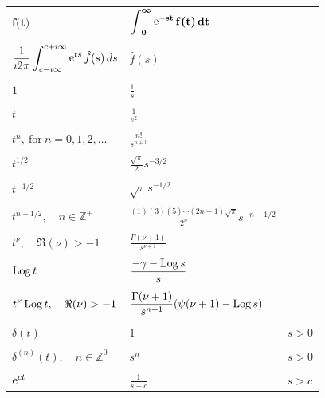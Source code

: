 \setlongtables
\begin{longtable}{lll}
  $\displaystyle \mathbf{f \boldsymbol{(} t \boldsymbol{)}}$
  & $\displaystyle \mathbf{\boldsymbol{\int}_0^{\boldsymbol{\infty}} \mathop{\mathrm{e}}\nolimits^{-s t}f \boldsymbol{(} t \boldsymbol{)} \,dt}$ 
  & \\
  \\
  $\displaystyle \frac{1}{\imath 2 \pi} 
  \int_{c - \imath \infty}^{c + \imath \infty} \mathop{\mathrm{e}}\nolimits^{t s} \hat{f}(s)\,d s$
  & $\displaystyle \hat{f}(s)$ 
  & \\
  \\
  $\displaystyle 1$
  & $\displaystyle \frac{1}{s}$
  & \\
  \\
  $\displaystyle t$
  & $\displaystyle \frac{1}{s^2}$
  & \\
  \\
  $\displaystyle t^n,\ \mathrm{for}\ n = 0,1,2,\ldots$
  & $\displaystyle \frac{n!}{s^{n+1}}$
  & \\
  \\
  $\displaystyle t^{1/2}$
  & $\displaystyle \frac{\sqrt{\pi}}{2} s^{-3/2}$
  & \\
  \\
  $\displaystyle t^{-1/2}$
  & $\displaystyle \sqrt{\pi} s^{-1/2}$
  & \\
  \\
  $\displaystyle t^{n-1/2}, \quad n \in \mathbb{Z}^+$
  & $\displaystyle \frac{(1) (3) (5) \cdots
    (2n-1) \sqrt{\pi}}{2^n} s^{-n-1/2}$
  & \\
  \\
  $\displaystyle t^\nu, \quad \Re(\nu) > -1$
  & $\displaystyle \frac{\Gamma(\nu+1)}{s^{\nu+1}}$
  & \\
  \\
  $\displaystyle \mathop{\mathrm{Log}}\nolimits t$
  & $\displaystyle \frac{-\gamma - \mathop{\mathrm{Log}}\nolimits s}{s}$
  & \\
  \\
  $\displaystyle t^\nu \mathop{\mathrm{Log}}\nolimits t, \quad \Re(\nu) > -1$
  & $\displaystyle \frac{\Gamma(\nu+1)}{s^{n+1}} (\psi(\nu+1) - \mathop{\mathrm{Log}}\nolimits s)$
  & \\
  \\
  $\displaystyle \delta(t)$
  & $\displaystyle 1$
  & $s > 0$ \\
  \\
  $\displaystyle \delta^{(n)}(t), \quad n \in \mathbb{Z}^{0+}$
  & $\displaystyle s^n$
  & $s > 0$ \\
  \\
  $\displaystyle \mathop{\mathrm{e}}\nolimits^{c t}$
  & $\displaystyle \frac{1}{s-c}$
  & $s > c$

\end{longtable}
